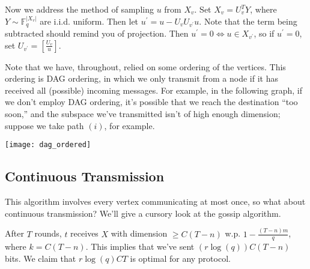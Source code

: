 \documentclass[11pt]{article}
\newcommand{\F}{\mathbb{F}}
\begin{document}
Now we address the method of sampling $u$ from $X_v$. Set $X_v = U_v^TY$, where $Y \sim \F_q^{|X_v|}$ are 
i.i.d. uniform. Then let $u^\prime = u - U_vU_{v^\prime}u$. Note that the term being subtracted should
remind you of projection. Then $u^\prime = 0 \iff u \in X_{v^\prime}$, so if $u^\prime = 0$, set 
$U_{v^\prime} = \left[\frac{U_v}{u}\right]$. 

Note that we have, throughout, relied on some ordering of the vertices. This ordering is DAG ordering,
in which we only transmit from a node if it has received all (possible) incoming messages. For example, 
in the following graph, if we don't employ DAG ordering, it's possible that we reach the destination
``too soon,'' and the subspace we've transmitted isn't of high enough dimension; suppose we take path
$(i)$, for example.

\begin{center}
\texttt{[image: dag\_ordered]}
\end{center}

\subsection{Continuous Transmission} 

This algorithm involves every vertex communicating at most once, so what about continuous transmission? 
We'll give a cursory look at the gossip algorithm. 

After $T$ rounds, $t$ receives $X$ with dimension $\geq C(T-n)$ w.p. $1 - \frac{(T - n)m}{q}$,
where $k = C(T-n)$. This implies that we've sent $(r\log(q))C(T-n)$ bits. We claim that $r\log(q)
CT$ is optimal for any protocol.
\end{document}

